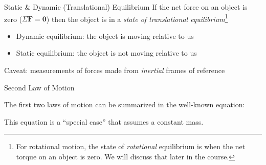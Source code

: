 \documentclass[12pt,compress,aspectratio=169]{beamer}
\begin{document}
\begin{frame}{Static \& Dynamic (Translational) Equilibrium}
  If the net force on an object is zero ($\Sigma\bm{F}=\bm{0}$) then the
  object is in a \emph{state of translational equilibrium}\footnote{For
    rotational motion, the state of \emph{rotational} equilibrium is when the
    net torque on an object is zero. We will discuss that later in the course.}
  \begin{itemize}
  \item Dynamic equilibrium: the object is moving relative to us
  \item Static equilibrium: the object is not moving relative to us
  \end{itemize}
  Caveat: measurements of forces made from \emph{inertial} frames of reference
\end{frame}



\begin{frame}{Second Law of Motion}
  \begin{center}
  \end{center}
  \vspace{.3in}The first two laws of motion can be summarized in the well-known
  equation:


  \textcolor{red!80!black}{This equation is a ``special case'' that assumes a
    constant mass.}
\end{frame}
\end{document}
